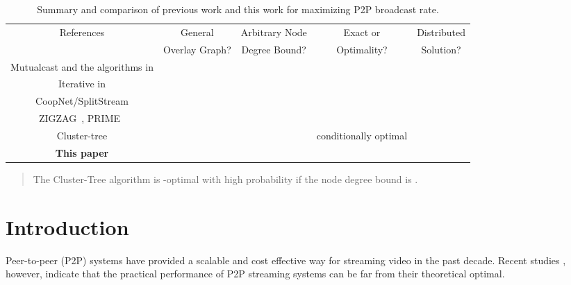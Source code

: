 \documentclass[10pt,conference]{IEEEtran}
\begin{document}
\begin{table*}
\caption{Summary and comparison of previous work and this work for maximizing
P2P broadcast rate.}


\label{tab:summary} \begin{small}

\begin{centering}
\begin{tabular}{|c|c|c|c|c|}
\hline
References\emph{ }  & General\emph{ }  & Arbitrary Node\emph{ }  & Exact or\emph{ }  & Distributed \tabularnewline
 & Overlay Graph?  & Degree Bound?  & Optimality?  & Solution?\tabularnewline
\hline
\hline
Mutualcast \cite{all:Mutualcast:LPZ05} and the algorithms in \cite{massoulie2007rdb,all:P2PStreaming:KLR.07}  &   &   & \textbf{}  & \textbf{}\tabularnewline
\hline
Iterative in \cite{yicui06_optimal,sudipta2009lcclc}  & \textbf{}  &   & \textbf{}  & \tabularnewline
\hline
CoopNet/SplitStream \cite{castro2003shb,padmanabhan2002ccn}  &   & \textbf{}  &   & \tabularnewline
\hline
ZIGZAG~\cite{zigzag}, PRIME~\cite{magharei2009prime}  & \textbf{}  & \textbf{}  &   & \textbf{}\tabularnewline
\hline
Cluster-tree \cite{streaming_capacity.icdcs10}  &   & \textbf{}  & conditionally optimal   & \tabularnewline
\hline
\textbf{This paper }  & \textbf{}  & \textbf{}  & \textbf{}  & \textbf{}\tabularnewline
\hline
\end{tabular}
\par\end{centering}

\end{small}
\begin{quote}
\begin{scriptsize}  The Cluster-Tree algorithm is -optimal
with high probability if the node degree bound is .
\end{scriptsize}
\end{quote}

\end{table*}



\section{Introduction}

\label{sec:Intro}

Peer-to-peer (P2P) systems have provided a scalable and cost effective
way for streaming video in the past decade. Recent studies \cite{fenglili,AbeKirCig,wang2007r,zhang2005coolstreaming},
however, indicate that the practical performance of P2P streaming
systems can be far from their theoretical optimal.
\end{document}

